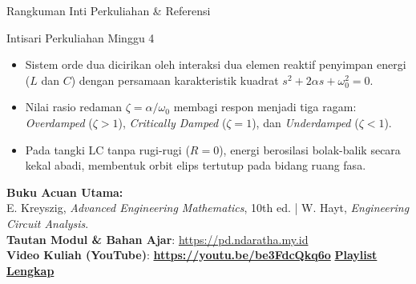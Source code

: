 \documentclass[aspectratio=169,10pt]{beamer}
\begin{document}
\begin{frame}{Rangkuman Inti Perkuliahan \& Referensi}
  \begin{exampleblock}{Intisari Perkuliahan Minggu 4}
    \begin{itemize}
      \item Sistem orde dua dicirikan oleh interaksi dua elemen reaktif penyimpan energi ($L$ dan $C$) dengan persamaan karakteristik kuadrat $s^2 + 2\alpha s + \omega_0^2 = 0$.
      \item Nilai rasio redaman $\zeta = \alpha/\omega_0$ membagi respon menjadi tiga ragam: \textit{Overdamped} ($\zeta > 1$), \textit{Critically Damped} ($\zeta = 1$), dan \textit{Underdamped} ($\zeta < 1$).
      \item Pada tangki LC tanpa rugi-rugi ($R = 0$), energi berosilasi bolak-balik secara kekal abadi, membentuk orbit elips tertutup pada bidang ruang fasa.
    \end{itemize}
  \end{exampleblock}
  \vspace{0.2cm}
  \begin{center}
    \small \textbf{Buku Acuan Utama:} \\
    E. Kreyszig, \textit{Advanced Engineering Mathematics}, 10th ed. | W. Hayt, \textit{Engineering Circuit Analysis}. \\
    \vspace{0.3cm}
    \textbf{Tautan Modul \& Bahan Ajar}: \url{https://pd.ndaratha.my.id} \\[0.12cm]\textbf{Video Kuliah (YouTube)}: {\color{red!85!black}\textbf{\url{https://youtu.be/be3FdcQkq6o}}} \quad \textbar \quad \href{https://www.youtube.com/playlist?list=PLS5oOZWXZeTw}{\color{unibblue}\textbf{Playlist Lengkap}}
  \end{center}
\end{frame}
\end{document}
